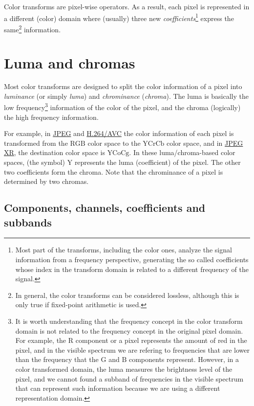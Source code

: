 Color transforms are pixel-wise operators. As a result, each pixel is
represented in a different (color) domain where (usually) three new
\emph{coefficients}\footnote{Most part of the transforms, including
the color ones, analyze the signal information from a frequency
perspective, generating the so called coefficients whose index in the
transform domain is related to a different frequency of the signal.}
express the same\footnote{In general, the color transforms can be
considered lossless, although this is only true if fixed-point
arithmetic is used.} information.

\section{Luma and chromas}

Most color transforms are designed to split the color information of a
pixel into \emph{luminance} (or simply \emph{luma}) and
\emph{chrominance} (\emph{chroma}). The luma is basically the low
frequency\footnote{It is worth understanding that the frequency
  concept in the color transform domain is not related to the
  frequency concept in the original pixel domain. For example, the
  $\text{R}$ component or a pixel represents the amount of red in the
  pixel, and in the visible spectrum we are refering to frequencies
  that are lower than the frequency that the $\text{G}$ and $\text{B}$
  components represent. However, in a color transformed domain, the
  luma measures the brightness level of the pixel, and we cannot found
  a subband of frequencies in the visible spectrum that can represent
  such information because we are using a different representation
  domain.} information of the color of the pixel, and the chroma
(logically) the high frequency information.

For example, in
\href{https://en.wikipedia.org/wiki/JPEG#JPEG_codec_example}{JPEG} and
\href{https://en.wikipedia.org/wiki/Advanced_Video_Coding#Fidelity_range_extensions_and_professional_profiles}{H.264/AVC}
the color information of each pixel is transformed from the
$\text{RGB}$ color space to the $\text{YCrCb}$ color space, and in
\href{https://en.wikipedia.org/wiki/JPEG_XR#Description}{JPEG XR}, the
destination color space is $\text{YCoCg}$. In these luma/chroma-based
color spaces, (the symbol) $\text{Y}$ represents the luma
(coefficient) of the pixel. The other two coefficients form the
chroma. Note that the chrominance of a pixel is determined by two
chromas.

\subsection{Components, channels, coefficients and subbands}

